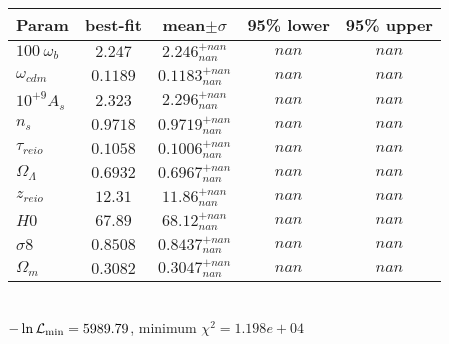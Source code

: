 \begin{tabular}{|l|c|c|c|c|} 
 \hline 
Param & best-fit & mean$\pm\sigma$ & 95\% lower & 95\% upper \\ \hline 
$100~\omega_{b }$ &$2.247$ & $2.246_{nan}^{+nan}$ & $nan$ & $nan$ \\ 
$\omega_{cdm }$ &$0.1189$ & $0.1183_{nan}^{+nan}$ & $nan$ & $nan$ \\ 
$10^{+9}A_{s }$ &$2.323$ & $2.296_{nan}^{+nan}$ & $nan$ & $nan$ \\ 
$n_{s }$ &$0.9718$ & $0.9719_{nan}^{+nan}$ & $nan$ & $nan$ \\ 
$\tau_{reio }$ &$0.1058$ & $0.1006_{nan}^{+nan}$ & $nan$ & $nan$ \\ 
$\Omega_{\Lambda }$ &$0.6932$ & $0.6967_{nan}^{+nan}$ & $nan$ & $nan$ \\ 
$z_{reio }$ &$12.31$ & $11.86_{nan}^{+nan}$ & $nan$ & $nan$ \\ 
$H0$ &$67.89$ & $68.12_{nan}^{+nan}$ & $nan$ & $nan$ \\ 
$\sigma8$ &$0.8508$ & $0.8437_{nan}^{+nan}$ & $nan$ & $nan$ \\ 
$\Omega_{m }$ &$0.3082$ & $0.3047_{nan}^{+nan}$ & $nan$ & $nan$ \\ 
\hline 
 \end{tabular} \\ 
$-\ln{\cal L}_\mathrm{min} =5989.79$, minimum $\chi^2=1.198e+04$ \\ 
